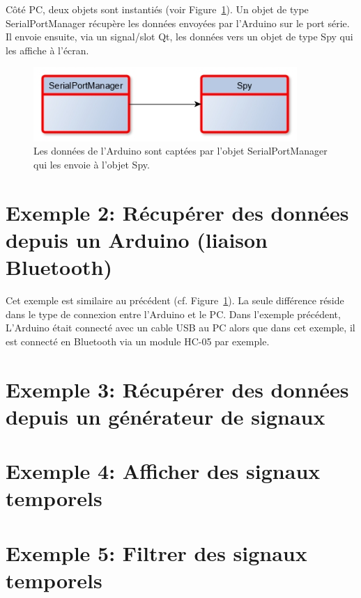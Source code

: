\documentclass{article}
\begin{document}
Côté PC, deux objets sont instantiés (voir Figure~\ref{ex1}). Un objet de type SerialPortManager récupère les données envoyées par l'Arduino sur le port série. 
Il envoie ensuite, via un signal/slot Qt, les données vers un objet de type Spy qui les affiche à l'écran.

\begin{figure}
 \centering
    \includegraphics[width=10cm]{images/GBMProject3A_ex1.jpg}
    \caption{Les données de l'Arduino sont captées par l'objet SerialPortManager qui les envoie à l'objet Spy.}
    \label{ex1}
\end{figure}


\section{Exemple 2: Récupérer des données depuis un Arduino (liaison Bluetooth)}

Cet exemple est similaire au précédent (cf. Figure~\ref{ex1}). La seule différence réside dans le type de connexion entre l'Arduino et le PC. 
Dans l'exemple précédent, L'Arduino était connecté avec un cable USB au PC alors que dans cet exemple, il est connecté en Bluetooth via un module HC-05 par exemple.

\section{Exemple 3: Récupérer des données depuis un générateur de signaux}

\section{Exemple 4: Afficher des signaux temporels}

\section{Exemple 5: Filtrer des signaux temporels}
\end{document}
